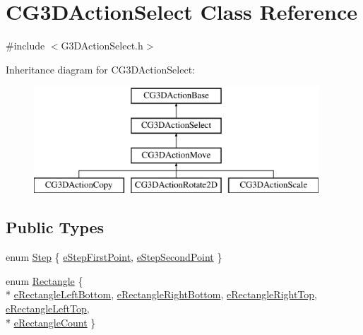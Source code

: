 \hypertarget{class_c_g3_d_action_select}{}\section{C\+G3\+D\+Action\+Select Class Reference}
\label{class_c_g3_d_action_select}


{\ttfamily \#include $<$G3\+D\+Action\+Select.\+h$>$}

Inheritance diagram for C\+G3\+D\+Action\+Select\+:\begin{figure}[H]
\begin{center}
\leavevmode
\includegraphics[height=4.000000cm]{class_c_g3_d_action_select}
\end{center}
\end{figure}
\subsection*{Public Types}
\begin{DoxyCompactItemize}
\item 
enum \hyperlink{class_c_g3_d_action_select_ac2107823317590f62bd9906da483bff4}{Step} \{ \hyperlink{class_c_g3_d_action_select_ac2107823317590f62bd9906da483bff4af9d2b33cd9e6abf523230c409413abce}{e\+Step\+First\+Point}, 
\hyperlink{class_c_g3_d_action_select_ac2107823317590f62bd9906da483bff4af4e86ec057591ef82da0c1af1c6ec23d}{e\+Step\+Second\+Point}
 \}
\item 
enum \hyperlink{class_c_g3_d_action_select_aab1b3255643c94752ce09839f17ebd9c}{Rectangle} \{ \\*
\hyperlink{class_c_g3_d_action_select_aab1b3255643c94752ce09839f17ebd9caf31399735111c2a2ac795e43e800c81b}{e\+Rectangle\+Left\+Bottom}, 
\hyperlink{class_c_g3_d_action_select_aab1b3255643c94752ce09839f17ebd9caa293b39a454a5387b0bd9a8cd860199c}{e\+Rectangle\+Right\+Bottom}, 
\hyperlink{class_c_g3_d_action_select_aab1b3255643c94752ce09839f17ebd9cac02f7a323763693aff9f2cd6440d42d6}{e\+Rectangle\+Right\+Top}, 
\hyperlink{class_c_g3_d_action_select_aab1b3255643c94752ce09839f17ebd9cad104b1c04a52662e1061219d7942f9e6}{e\+Rectangle\+Left\+Top}, 
\\*
\hyperlink{class_c_g3_d_action_select_aab1b3255643c94752ce09839f17ebd9ca0d0b925f221a8ff274305be3afa5197b}{e\+Rectangle\+Count}
 \}
\end{DoxyCompactItemize}
